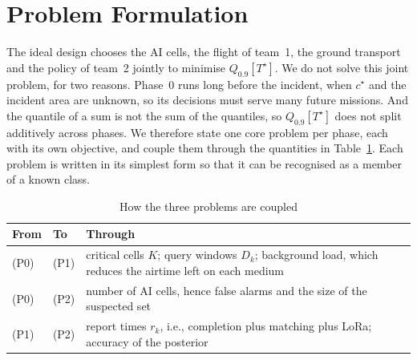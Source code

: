 \section{Problem Formulation}\label{sec:problem}
The ideal design chooses the AI cells, the flight of team~1, the ground transport and the policy of team~2 jointly to
minimise $Q_{0.9}[T^\star]$. We do not solve this joint problem, for two reasons. Phase~0 runs long before the incident,
when $c^\star$ and the incident area are unknown, so its decisions must serve many future missions. And the quantile of a
sum is not the sum of the quantiles, so $Q_{0.9}[T^\star]$ does not split additively across phases. We therefore state
one core problem per phase, each with its own objective, and couple them through the quantities in
Table~\ref{tab:coupling}. Each problem is written in its simplest form so that it can be recognised as a member of a
known class.

\begin{table}[t]\centering
\caption{How the three problems are coupled}\label{tab:coupling}
\footnotesize
\begin{tabular}{@{}llp{}@{}}
\toprule
From & To & Through\\
\midrule
(P0) & (P1) & critical cells $K$; query windows $D_k$; background load, which reduces the airtime left on each medium\\
(P0) & (P2) & number of AI cells, hence false alarms and the size of the suspected set\\
(P1) & (P2) & report times $r_k$, i.e., completion plus matching plus LoRa; accuracy of the posterior\\
\bottomrule
\end{tabular}
\end{table}

